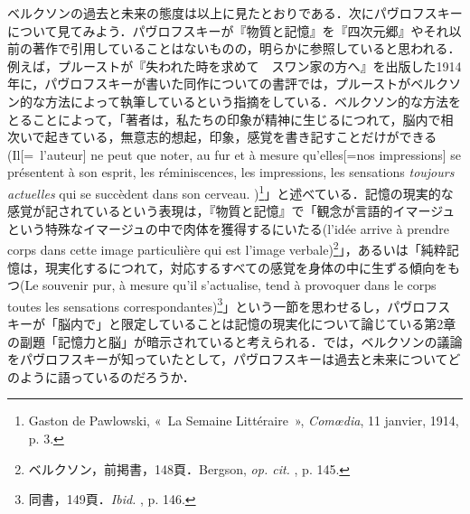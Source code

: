 ベルクソンの過去と未来の態度は以上に見たとおりである．次にパヴロフスキーについて見てみよう．パヴロフスキーが『物質と記憶』を『四次元郷』やそれ以前の著作で引用していることはないものの，明らかに参照していると思われる．例えば，プルーストが『失われた時を求めて　スワン家の方へ』を出版した1914年に，パヴロフスキーが書いた同作についての書評では，プルーストがベルクソン的な方法によって執筆しているという指摘をしている．ベルクソン的な方法をとることによって，「著者は，私たちの印象が精神に生じるにつれて，脳内で相次いで起きている，無意志的想起，印象，感覚を書き記すことだけができる(Il[=~l'auteur] ne peut que noter, au fur et à mesure qu'elles[=nos impressions] se présentent à son esprit, les réminiscences, les impressions, les sensations \emph{toujours actuelles} qui se succèdent dans son cerveau. )\footnote{Gaston de Pawlowski, «~La Semaine Littéraire~», \emph{Comœdia}, 11 janvier, 1914, p. 3.}」と述べている．記憶の現実的な感覚が記されているという表現は，『物質と記憶』で「観念が言語的イマージュという特殊なイマージュの中で肉体を獲得するにいたる(l'idée arrive à prendre corps dans cette image particulière qui est l'image verbale)\footnote{ベルクソン，前掲書，148頁．Bergson, \emph{op. cit. }, p. 145.}」，あるいは「純粋記憶は，現実化するにつれて，対応するすべての感覚を身体の中に生ずる傾向をもつ(Le souvenir pur, à mesure qu'il s'actualise, tend à provoquer dans le corps toutes les sensations correspondantes)\footnote{同書，149頁．\emph{Ibid. }, p. 146.}」という一節を思わせるし，パヴロフスキーが「脳内で」と限定していることは記憶の現実化について論じている第2章の副題「記憶力と脳」が暗示されていると考えられる．では，ベルクソンの議論をパヴロフスキーが知っていたとして，パヴロフスキーは過去と未来についてどのように語っているのだろうか．

